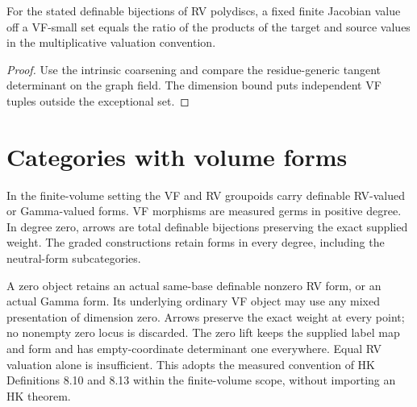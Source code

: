 \begin{proposition}
\label{prop:gamma-polydisc-descent}
\leanok
For the stated definable bijections of RV polydiscs, a fixed finite
Jacobian value off a VF-small set equals the ratio of the products of
the target and source values in the multiplicative valuation convention.
\end{proposition}
\begin{proof}
\leanok
{}
Use the intrinsic coarsening and compare the residue-generic tangent
determinant on the graph field. The dimension bound puts independent
VF tuples outside the exceptional set.
\end{proof}

\section{Categories with volume forms}

\begin{definition}
\label{def:volume-categories}
\leanok
In the finite-volume setting the VF and RV groupoids carry
definable RV-valued or Gamma-valued forms. VF morphisms are
measured germs in positive degree. In degree zero, arrows are total
definable bijections preserving the exact supplied weight. The graded
constructions retain forms in every degree, including the neutral-form
subcategories.
\end{definition}

\begin{definition}
\label{def:weighted-zero}
\leanok
A zero object retains an actual same-base definable nonzero RV form,
or an actual Gamma form. Its underlying ordinary VF object may use
any mixed presentation of dimension zero. Arrows preserve the exact
weight at every point; no nonempty zero locus is discarded. The zero
lift keeps the supplied label map and form and has empty-coordinate
determinant one everywhere. Equal RV valuation alone is insufficient.
This adopts the measured convention of HK Definitions 8.10 and 8.13
within the finite-volume scope, without importing an HK theorem.
\end{definition}

